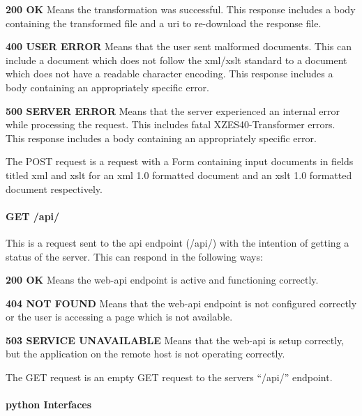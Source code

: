 \begin{enmerate}
\begin{itemzie}
\begin{description}
  \item {
      \textbf{200 OK}  Means the transformation was successful.
        This response includes a body containing the transformed file and a \gls{uri} to re-download the response file.
    }
    \item {
      \textbf{400 USER ERROR} Means that the user sent malformed documents.
        This can include a document which does not follow the \gls{xml}/\gls{xslt} standard to a document which does not have a readable character encoding.
        This response includes a body containing an appropriately specific error.
    }
    \item {
      \textbf{500 SERVER ERROR} Means that the server experienced an internal error while processing the request.
         This includes fatal XZES40-Transformer errors.
        This response includes a body containing an appropriately specific error.
    }
\end{description}

The POST request is a request with a Form containing input documents in fields titled \gls{xml} and \gls{xslt} for an \gls{xml} 1.0 formatted document and an \gls{xslt} 1.0 formatted document respectively.

\paragraph{GET /api/}

This is a request sent to the \gls{api} endpoint (/api/) with the intention of getting a status of the server. This can respond in the following ways:

\begin{description}
  \item \textbf{200 OK} Means the \gls{web-api} endpoint is active and functioning correctly.
    \item \textbf{404 NOT FOUND} Means that the \gls{web-api} endpoint is not configured correctly or the user is accessing a page which is not available.
    \item \textbf{503 SERVICE UNAVAILABLE} Means that the \gls{web-api} is setup correctly, but the application on the remote host is not operating correctly.
\end{description}

The GET request is an empty GET request to the servers ``/api/'' endpoint.

\paragraph{\gls{python} Interfaces}


\end{itemzie}
\end{enmerate}
